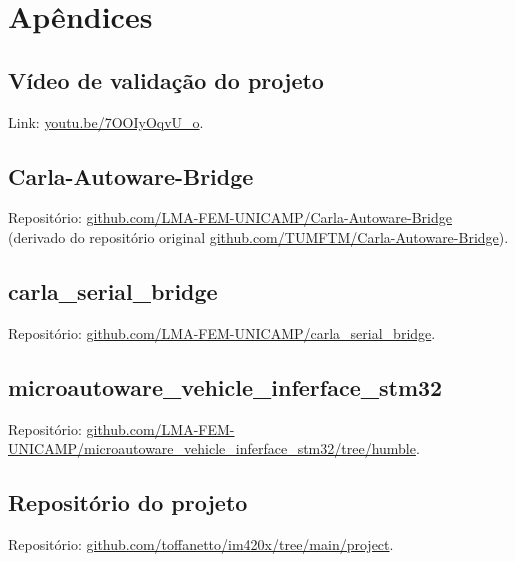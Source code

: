 \thispagestyle{plain}
\section*{Apêndices}

\subsection*{Vídeo de validação do projeto}

Link: \url{youtu.be/7OOIyOqvU_o}.

\subsection*{Carla-Autoware-Bridge}

Repositório: \url{github.com/LMA-FEM-UNICAMP/Carla-Autoware-Bridge} (derivado do repositório original \url{github.com/TUMFTM/Carla-Autoware-Bridge}).

\subsection*{carla\_serial\_bridge}

Repositório: \url{github.com/LMA-FEM-UNICAMP/carla_serial_bridge}.

\subsection*{microautoware\_vehicle\_inferface\_stm32}

Repositório: \url{github.com/LMA-FEM-UNICAMP/microautoware_vehicle_inferface_stm32/tree/humble}.

\subsection*{Repositório do projeto}

Repositório: \url{github.com/toffanetto/im420x/tree/main/project}.